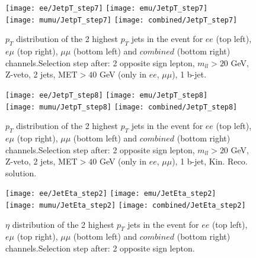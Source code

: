 \documentclass[12pt, a4paper, titlepage]{article}
\begin{document}
\clearpage
\newpage

\begin{figure}
  \texttt{[image: ee/JetpT\_step7]}
  \texttt{[image: emu/JetpT\_step7]}\\
  \texttt{[image: mumu/JetpT\_step7]}
  \texttt{[image: combined/JetpT\_step7]}
\caption{$p_T$ distribution of the 2 highest $p_T$ jets in the event for $ee$ (top left), $e\mu$ (top right), $\mu\mu$ (bottom left) and $combined$ (bottom right) channels.\newline Selection step after: 2 opposite sign lepton, $m_{ll}>20$ GeV, Z-veto, 2 jets, MET$>40$ GeV (only in $ee$, $\mu\mu$), 1 b-jet.}
\end{figure}

\clearpage
\newpage


\begin{figure}
  \texttt{[image: ee/JetpT\_step8]}
  \texttt{[image: emu/JetpT\_step8]}\\
  \texttt{[image: mumu/JetpT\_step8]}
  \texttt{[image: combined/JetpT\_step8]}
\caption{$p_T$ distribution of the 2 highest $p_T$ jets in the event for $ee$ (top left), $e\mu$ (top right), $\mu\mu$ (bottom left) and $combined$ (bottom right) channels.\newline Selection step after: 2 opposite sign lepton, $m_{ll}>20$ GeV, Z-veto, 2 jets, MET$>40$ GeV (only in $ee$, $\mu\mu$), 1 b-jet, Kin. Reco. solution.}
\end{figure}

\clearpage
\newpage





\begin{figure}
  \texttt{[image: ee/JetEta\_step2]}
  \texttt{[image: emu/JetEta\_step2]}\\
  \texttt{[image: mumu/JetEta\_step2]}
  \texttt{[image: combined/JetEta\_step2]}
\caption{$\eta$ distribution of the 2 highest $p_T$ jets in the event for $ee$ (top left), $e\mu$ (top right), $\mu\mu$ (bottom left) and $combined$ (bottom right) channels.\newline Selection step after: 2 opposite sign lepton.}
\end{figure}
\end{document}

